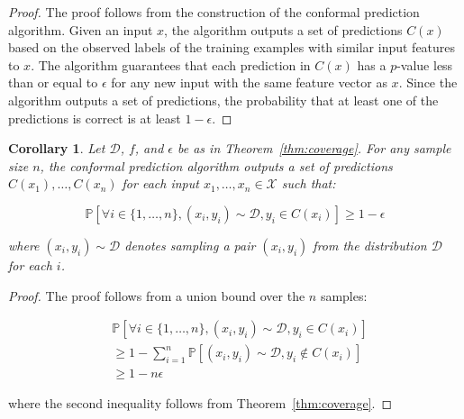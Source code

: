 \documentclass[9pt,conference]{IEEEtran}
\newtheorem{corollary}{Corollary}
\begin{document}
\begin{proof}
The proof follows from the construction of the conformal prediction algorithm. Given an input $x$, the algorithm outputs a set of predictions $C(x)$ based on the observed labels of the training examples with similar input features to $x$. The algorithm guarantees that each prediction in $C(x)$ has a $p$-value less than or equal to $\epsilon$ for any new input with the same feature vector as $x$. Since the algorithm outputs a set of predictions, the probability that at least one of the predictions is correct is at least $1-\epsilon$. 
\end{proof}

\begin{corollary}\label{cor:coverage}
Let $\mathcal{D}$, $f$, and $\epsilon$ be as in Theorem~\ref{thm:coverage}. For any sample size $n$, the conformal prediction algorithm outputs a set of predictions $C(x_1),\ldots,C(x_n)$ for each input $x_1,\ldots,x_n \in \mathcal{X}$ such that:

\begin{equation*}
\mathbb{P}[\forall i \in \{1,\ldots,n\}, (x_i,y_i) \sim \mathcal{D}, y_i \in C(x_i)] \geq 1-\epsilon
\end{equation*}

where $(x_i,y_i) \sim \mathcal{D}$ denotes sampling a pair $(x_i,y_i)$ from the distribution $\mathcal{D}$ for each $i$.

\end{corollary}

\begin{proof}
The proof follows from a union bound over the $n$ samples:

\begin{equation*}
\begin{aligned}
&\mathbb{P}[\forall i \in \{1,\ldots,n\}, (x_i,y_i) \sim \mathcal{D}, y_i \in C(x_i)] \\
&\geq 1 - \sum_{i=1}^n \mathbb{P}[(x_i, y_i) \sim \mathcal{D}, y_i \notin C(x_i)] \\
&\geq 1 - n \epsilon
\end{aligned}
\end{equation*}

where the second inequality follows from Theorem~\ref{thm:coverage}. 
\end{proof}

\end{document}
